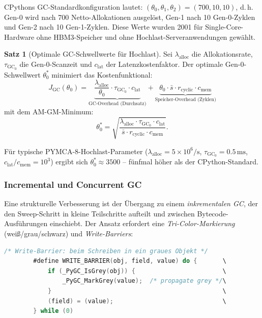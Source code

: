 ﻿\documentclass[a4paper,12pt]{scrreprt}
\theoremstyle{definition}
\newtheorem{satz}{Satz}[section]
\begin{document}
	CPythons GC-Standardkonfiguration lautet:
	$(\theta_0, \theta_1, \theta_2) = (700, 10, 10)$, d.\,h. Gen-0
	wird nach 700 Netto-Allokationen ausgelöst, Gen-1 nach 10 Gen-0-Zyklen
	und Gen-2 nach 10 Gen-1-Zyklen. Diese Werte wurden 2001 für
	Single-Core-Hardware ohne HBM3-Speicher und ohne Hochlast-Serveranwendungen
	gewählt.
	
	\begin{satz}[Optimale GC-Schwellwerte für Hochlast]
		\label{satz:gc_thresholds}
		Sei $\lambda_{\mathrm{alloc}}$ die Allokationsrate,
		$\tau_{\mathrm{GC}_0}$ die Gen-0-Scanzeit und $c_{\mathrm{lat}}$ der
		Latenzkostenfaktor. Der optimale Gen-0-Schwellwert $\theta_0^*$
		minimiert das Kostenfunktional:
		\[
		J_{\mathrm{GC}}(\theta_0) = \underbrace{\frac{\lambda_{\mathrm{alloc}}}{\theta_0}
			\cdot \tau_{\mathrm{GC}_0} \cdot c_{\mathrm{lat}}}_{\text{GC-Overhead (Durchsatz)}}
		+ \underbrace{\theta_0 \cdot \bar{s} \cdot r_{\mathrm{cyclic}}
			\cdot c_{\mathrm{mem}}}_{\text{Speicher-Overhead (Zyklen)}}
		\]
		mit dem AM-GM-Minimum:
		\[
		\theta_0^* = \sqrt{\frac{\lambda_{\mathrm{alloc}} \cdot \tau_{\mathrm{GC}_0}
				\cdot c_{\mathrm{lat}}}{\bar{s} \cdot r_{\mathrm{cyclic}} \cdot c_{\mathrm{mem}}}}.
		\]
	\end{satz}
	
	Für typische PYMCA-8-Hochlast-Parameter ($\lambda_{\mathrm{alloc}}
	= 5 \times 10^6/\mathrm{s}$, $\tau_{\mathrm{GC}_0} = 0.5\,\mathrm{ms}$,
	$c_{\mathrm{lat}}/c_{\mathrm{mem}} = 10^3$) ergibt sich
	$\theta_0^* \approx 3500$ -- fünfmal höher als der CPython-Standard.
	
	\subsubsection{Incremental und Concurrent GC}
	
	Eine strukturelle Verbesserung ist der Übergang zu einem
	\emph{inkrementalen GC}, der den Sweep-Schritt in kleine
	Teilschritte aufteilt und zwischen Bytecode-Ausführungen einschiebt.
	Der Ansatz erfordert eine \emph{Tri-Color-Markierung} (weiß/grau/schwarz)
	und \emph{Write-Barriers}:
	
	\begin{lstlisting}[language=C, caption={Inkrementaler GC: Write-Barrier fuer Tri-Color},
		label=lst:incr_gc]
		/* Write-Barrier: beim Schreiben in ein graues Objekt */
		#define WRITE_BARRIER(obj, field, value) do {       \
			if (_PyGC_IsGrey(obj)) {                        \
				_PyGC_MarkGrey(value);  /* propagate grey */\
			}                                               \
			(field) = (value);                              \
		} while (0)
	\end{lstlisting}
	
\end{document}
